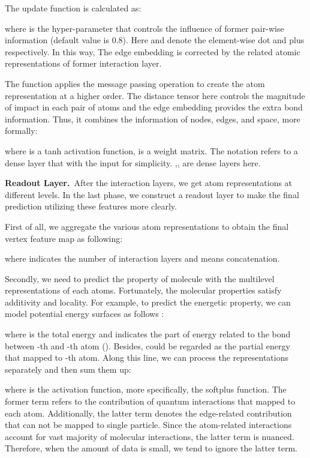 \documentclass[letterpaper]{article} \usepackage{bm}
\begin{document}
The update function  is calculated as:  

   where  is the hyper-parameter that controls the influence of former pair-wise information (default value is 0.8). Here  and  denote the element-wise dot and plus respectively. In this way, The edge embedding is corrected by the related atomic representations of former interaction layer.

The function  applies the message passing operation to create the atom representation at a higher order. The distance tensor  here controls the magnitude of impact in each pair of atoms and the edge embedding  provides the extra bond information. Thus, it combines the information of nodes, edges, and space, more formally:  
   
where  is a tanh activation function,  is a weight matrix. The notation  refers to a dense layer that  with the input  for simplicity. ,, are dense layers here.



\textbf{Readout Layer.}\ After the interaction layers, we get atom representations at different levels. In the last phase, we construct a readout layer to make the final prediction utilizing these features more clearly.   

First of all, we aggregate the various atom representations to obtain the final vertex feature map as following:  

     

\noindent where  indicates the number of interaction layers and  means concatenation.    

Secondly, we need to predict the property of molecule with the multilevel representations of each atoms. Fortunately, the molecular properties satisfy additivity and locality. For example, to predict the energetic property, we can model potential energy surfaces as follows \cite{behler2014representing,cubuk2017representations}:  

    

\noindent where  is the total energy and  indicates the part of energy related to the bond between -th and -th atom (). Besides,  could be regarded as the partial energy that mapped to -th atom. Along this line, we can process the representations separately and then sum them up:   
       
\noindent where  is the activation function, more specifically, the softplus function. The former term refers to the contribution of quantum interactions that mapped to each atom. Additionally, the latter term denotes the edge-related contribution that can not be mapped to single particle. Since the atom-related interactions account for vast majority of molecular interactions, the latter term is nuanced. Therefore, when the amount of data is small, we tend to ignore the latter term.
\end{document}
